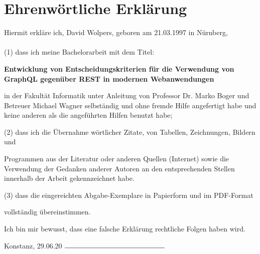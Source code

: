 \chapter*{Ehrenwörtliche Erklärung}

Hiermit erkläre ich, David Wolpers, geboren am 21.03.1997 in Nürnberg, \\
\\
(1)	dass ich meine Bachelorarbeit mit dem Titel:\\
\begin{center}
\textbf{Entwicklung von Entscheidungskriterien für die Verwendung von GraphQL gegenüber REST in modernen Webanwendungen}
\end{center}
\begin{addmargin}[1.5em]{0em}
\begin{flushleft}
in der Fakultät Informatik unter Anleitung von Professor Dr. Marko Boger und Betreuer Michael Wagner selbständig und ohne fremde Hilfe angefertigt habe und keine anderen als die angeführten Hilfen benutzt habe;
\end{flushleft}
\end{addmargin}

\begin{flushleft}
(2)	dass ich die Übernahme wörtlicher Zitate, von Tabellen, Zeichnungen, Bildern und 
\begin{addmargin}[1.5em]{0em}
Programmen aus der Literatur oder anderen Quellen (Internet) sowie die Verwendung der Gedanken anderer Autoren an den entsprechenden Stellen innerhalb der Arbeit gekennzeichnet habe.
\end{addmargin}
\end{flushleft}
\begin{flushleft}
(3)	dass die eingereichten Abgabe-Exemplare in Papierform und im PDF-Format 
\begin{addmargin}[1.5em]{0em}
vollständig übereinstimmen.
\end{addmargin}
\end{flushleft}
\begin{addmargin}[0.5em]{0em}
Ich bin mir bewusst, dass eine falsche Erklärung rechtliche Folgen haben wird.
\end{addmargin}
\vspace{\baselineskip}


Konstanz, 29.06.20	 \hspace{3cm} $\rule{5cm}{0.15mm}$

